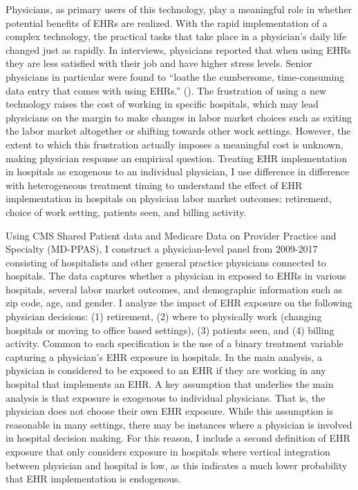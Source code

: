 \documentclass[11pt]{article}
\begin{document}
Physicians, as primary users of this technology, play a meaningful role in whether potential benefits of EHRs are realized. With the rapid implementation of a complex technology, the practical tasks that take place in a physician's daily life changed just as rapidly. In interviews, physicians reported that when using EHRs they are less satisfied with their job and have higher stress levels. Senior physicians in particular were found to “loathe the cumbersome, time-consuming data entry that comes with using EHRs.” (\cite{CollierBurnout}). The frustration of using a new technology raises the cost of working in specific hospitals, which may lead physicians on the margin to make changes in labor market choices such as exiting the labor market altogether or shifting towards other work settings. However, the extent to which this frustration actually imposes a meaningful cost is unknown, making physician response an empirical question. Treating EHR implementation in hospitals as exogenous to an individual physician, I use difference in difference with heterogeneous treatment timing to understand the effect of EHR implementation in hospitals on physician labor market outcomes: retirement, choice of work setting, patients seen, and billing activity.

Using CMS Shared Patient data and Medicare Data on Provider Practice and Specialty (MD-PPAS), I construct a physician-level panel from 2009-2017 consisting of hospitalists and other general practice physicians connected to hospitals. The data captures whether a physician in exposed to EHRs in various hospitals, several labor market outcomes, and demographic information such as zip code, age, and gender. I analyze the impact of EHR exposure on the following physician decisions: (1) retirement, (2) where to physically work (changing hospitals or moving to office based settings), (3) patients seen, and (4) billing activity. Common to each specification is the use of a binary treatment variable capturing a physician's EHR exposure in hospitals. In the main analysis, a physician is considered to be exposed to an EHR if they are working in any hospital that implements an EHR. A key assumption that underlies the main analysis is that exposure is exogenous to individual physicians. That is, the physician does not choose their own EHR exposure. While this assumption is reasonable in many settings, there may be instances where a physician is involved in hospital decision making. For this reason, I include a second definition of EHR exposure that only considers exposure in hospitals where vertical integration between physician and hospital is low, as this indicates a much lower probability that EHR implementation is endogenous. 
\end{document}
